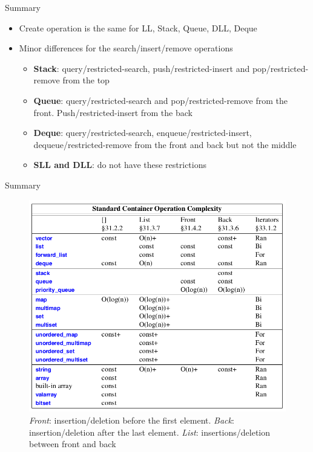 \documentclass{beamer}
\begin{document}
\begin{frame}{Summary}
	\begin{itemize}
		\item Create operation is the same for LL, Stack, Queue, DLL, Deque
		\item Minor differences for the search/insert/remove operations
			\begin{itemize}
				\item \textbf{Stack}: query/restricted-search, push/restricted-insert and pop/restricted-remove from the top
				\item \textbf{Queue}: query/restricted-search  and pop/restricted-remove from the front. Push/restricted-insert from the back
				\item \textbf{Deque}: query/restricted-search, enqueue/restricted-insert, dequeue/restricted-remove from the front and back but not the middle
				\item \textbf{SLL and DLL}: do not have these restrictions
			\end{itemize}
	\end{itemize}
\end{frame}
	
\begin{frame}{Summary}
    \begin{figure}
        \centering
        \includegraphics[scale=0.27]{imgs/2-LDS/containers_complexities.png}
        \caption{\textit{Front}: insertion/deletion before the first element. \textit{Back}: insertion/deletion after the last element. \textit{List}: insertions/deletion between front and back}
        \label{fig:lds_summary}
    \end{figure}
\end{frame}
\end{document}
